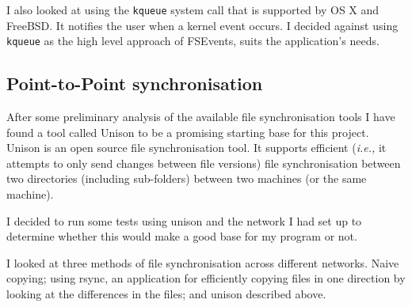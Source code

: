 \documentclass[12pt]{article}
\begin{document}
\begin{itemize}
\begin{itemize}
        I also looked at using the \texttt{kqueue}\cite{kqueue-man} system call that is
        supported by OS X and FreeBSD. It notifies the user
        when a kernel event occurs. I decided against using
        \texttt{kqueue} as the high level approach of FSEvents,
        suits the application's needs.
        \end{itemize}

\end{itemize}

\subsection{Point-to-Point synchronisation}
After some preliminary analysis of the available file synchronisation
tools I have found a tool called Unison to be a promising starting
base for this project. Unison is an open source file synchronisation tool.
It supports efficient (\emph{i.e.,} it attempts to only send changes between file versions) file synchronisation between two
directories (including sub-folders) between two machines (or the same
machine).

I decided to run some tests using unison 
and the network
I had set up to determine whether this would make a good base for
my program or not.

I looked at three methods of file synchronisation across
different networks. Naive copying; using rsync, an application
for efficiently copying files in one direction by looking at
the differences in the files; and unison described above.
\end{document}

